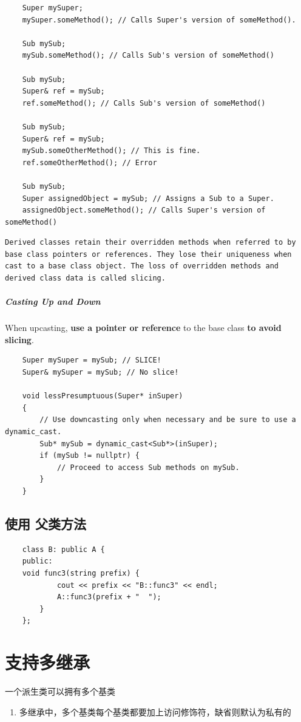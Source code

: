 \documentclass[UTF8,a4paper,12pt]{ctexbook} %
\begin{document}
				\begin{lstlisting}
	Super mySuper;
	mySuper.someMethod(); // Calls Super's version of someMethod().
	
	Sub mySub;
	mySub.someMethod(); // Calls Sub's version of someMethod()
	
	Sub mySub;
	Super& ref = mySub;
	ref.someMethod(); // Calls Sub's version of someMethod()
	
	Sub mySub;
	Super& ref = mySub;
	mySub.someOtherMethod(); // This is fine.
	ref.someOtherMethod(); // Error
	
	Sub mySub;
	Super assignedObject = mySub; // Assigns a Sub to a Super.
	assignedObject.someMethod(); // Calls Super's version of someMethod()
				\end{lstlisting}
				
				\begin{lstlisting}[frame = lTbr]
    Derived classes retain their overridden methods when referred to by base class pointers or references. They lose their uniqueness when cast to a base class object. The loss of overridden methods and derived class data is called slicing.
				\end{lstlisting}
				
				\subparagraph{Casting Up and Down}
					When upcasting, \textbf{use a pointer or reference} to the base class \textbf{to avoid slicing}.
					
				\begin{lstlisting}
	Super mySuper = mySub; // SLICE!
	Super& mySuper = mySub; // No slice!
	
	void lessPresumptuous(Super* inSuper)
	{
		// Use downcasting only when necessary and be sure to use a dynamic_cast.
		Sub* mySub = dynamic_cast<Sub*>(inSuper); 	
		if (mySub != nullptr) {
			// Proceed to access Sub methods on mySub.
		}
	}
				\end{lstlisting}
				
		\subsection{使用 父类方法}	
			\begin{lstlisting}
	class B: public A {
	public:
	void func3(string prefix) {
			cout << prefix << "B::func3" << endl;
			A::func3(prefix + "  ");
		}
	};
			\end{lstlisting}
					
	\section{支持多继承}一个派生类可以拥有多个基类
	        \begin{enumerate}[fullwidth,itemindent=2em,label=(\arabic*)]
	          \item 多继承中，多个基类每个基类都要加上访问修饰符，缺省则默认为私有的
	        \end{enumerate}
        
\end{document}
